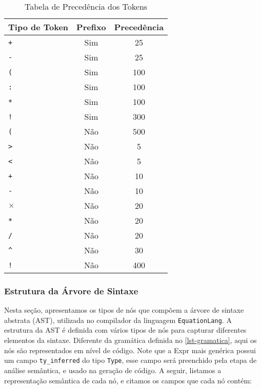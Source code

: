 \begin{table}[h!]
\centering
\begin{tabular}{|l|c|c|}
\hline
\textbf{Tipo de Token} & \textbf{Prefixo} & \textbf{Precedência}\\ \hline
\texttt{+}            & Sim              & 25                   \\ \hline
\texttt{-}            & Sim              & 25                   \\ \hline
\texttt{(}            & Sim              & 100                  \\ \hline
\texttt{:}            & Sim              & 100                  \\ \hline
\texttt{*}            & Sim              & 100                  \\ \hline
\texttt{!}            & Sim              & 300                  \\ \hline
\texttt{(}            & Não              & 500                  \\ \hline
\texttt{>}            & Não              & 5                    \\ \hline
\texttt{<}            & Não              & 5                    \\ \hline
\texttt{+}            & Não              & 10                   \\ \hline
\texttt{-}            & Não              & 10                   \\ \hline
$\times$              & Não              & 20                   \\ \hline
\texttt{*}            & Não              & 20                   \\ \hline
\texttt{/}            & Não              & 20                   \\ \hline
\texttt{\textasciicircum} & Não           & 30                  \\ \hline
\texttt{!}            & Não              & 400                  \\ \hline
\end{tabular}
\caption{Tabela de Precedência dos Tokens}
\label{tab-token-precedence}
\end{table}


\subsubsection{Estrutura da Árvore de Sintaxe}
Nesta seção, apresentamos os tipos de nós que compõem a árvore de sintaxe abstrata (AST), utilizada no compilador da linguagem \texttt{EquationLang}. A estrutura da AST é definida com vários tipos de nós para capturar diferentes elementos da sintaxe. Diferente da gramática definida no \autoref{lst-gramatica}, aqui os nós são representados em nível de código. Note que a Expr mais genérica possui um campo \texttt{ty\_inferred} do tipo \texttt{Type}, esse campo será preenchido pela etapa de análise semântica, e usado na geração de código. A seguir, listamos a representação semântica de cada nó, e citamos os campos que cada nó contém:


